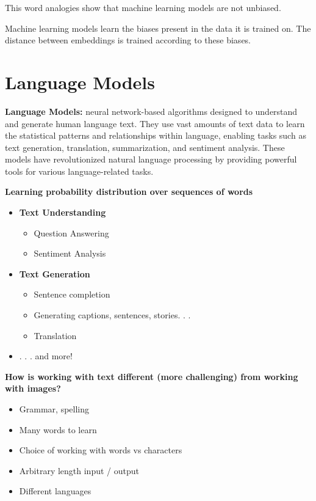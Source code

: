\begin{idea}
    This word analogies show that machine learning models are not unbiased. 
\end{idea}
\begin{warning}
    Machine learning models learn the biases present in the data it is trained on. The distance between embeddings is trained according to these biases.
\end{warning}

\section{Language Models}

\begin{definition}
    \textbf{Language Models:} neural network-based algorithms designed to understand and generate human language text. They use vast amounts of text data to learn the statistical patterns and relationships within language, enabling tasks such as text generation, translation, summarization, and sentiment analysis. These models have revolutionized natural language processing by providing powerful tools for various language-related tasks.
\end{definition}

\noindent\textbf{Learning probability distribution over sequences of words}
\begin{itemize}
    \item \textbf{Text Understanding}
    \begin{itemize}
        \item Question Answering
        \item Sentiment Analysis
    \end{itemize}
    \item \textbf{Text Generation}
    \begin{itemize}
        \item Sentence completion
        \item Generating captions, sentences, stories. . .
        \item Translation
    \end{itemize}
    \item . . . and more!
\end{itemize}

\noindent \textbf{How is working with text different (more challenging) from working with images?}
\begin{itemize}
    \item Grammar, spelling
    \item Many words to learn
    \item Choice of working with words vs characters
    \item Arbitrary length input / output
    \item Different languages
\end{itemize}

